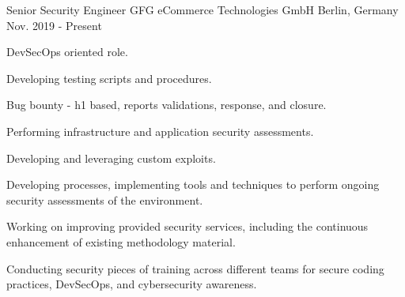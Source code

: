 

\begin{cventries}

  \cventry
    {Senior Security Engineer} %
    {GFG eCommerce Technologies GmbH} %
    {Berlin, Germany} %
    {Nov. 2019 - Present} %
    {
      \begin{cvitems} %
        \item {DevSecOps oriented role.}
        \item {Developing testing scripts and procedures.}
        \item {Bug bounty - h1 based, reports validations, response, and closure.}
        \item {Performing infrastructure and application security assessments.}
        \item {Developing and leveraging custom exploits.}
        \item {Developing processes, implementing tools and techniques to perform ongoing security assessments of the environment.}
        \item {Working on improving provided security services, including the continuous enhancement of existing methodology material.}
        \item {Conducting security pieces of training across different teams for secure coding practices, DevSecOps, and cybersecurity awareness.}
      \end{cvitems}
    }


\end{cventries}
